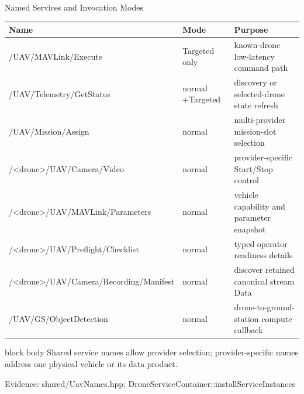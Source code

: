 \documentclass[aspectratio=169]{beamer}
\newcommand{\bluebox}[1]{%
  \begin{beamercolorbox}[rounded=true,shadow=false,sep=0.65em,wd=0.94\linewidth]{block body}
  #1
  \end{beamercolorbox}
}
\newcommand{\evidence}[1]{%
  \vfill\par\noindent
  \begin{minipage}{\linewidth}
  \raggedright{\color{SoftGray}\tiny Evidence: #1}\par
  \end{minipage}
}
\begin{document}
\begin{frame}{Named Services and Invocation Modes}
\scriptsize
\renewcommand{\arraystretch}{1.12}
\begin{tabularx}{\textwidth}{>{\ttfamily}p{4.6cm} p{2.7cm} Y}
\toprule
\textbf{Name} & \textbf{Mode} & \textbf{Purpose} \\
\midrule
/UAV/MAVLink/Execute & Targeted only & known-drone low-latency command path \\
/UAV/Telemetry/GetStatus & normal +\newline Targeted & discovery or selected-drone state refresh \\
/UAV/Mission/Assign & normal & multi-provider mission-slot selection \\
/<drone>/UAV/Camera/Video & normal & provider-specific Start/Stop control \\
/<drone>/UAV/MAVLink/\newline Parameters & normal & vehicle capability and parameter snapshot \\
/<drone>/UAV/Preflight/\newline Checklist & normal & typed operator readiness details \\
/<drone>/UAV/Camera/\newline Recording/Manifest & normal & discover retained canonical stream Data \\
/UAV/GS/ObjectDetection & normal & drone-to-ground-station compute callback \\
\bottomrule
\end{tabularx}

\vspace{0.35em}
\bluebox{Shared service names allow provider selection; provider-specific names address one physical vehicle or its data product.}
\evidence{shared/UavNames.hpp; DroneServiceContainer::installServiceInstances}
\end{frame}
\end{document}
